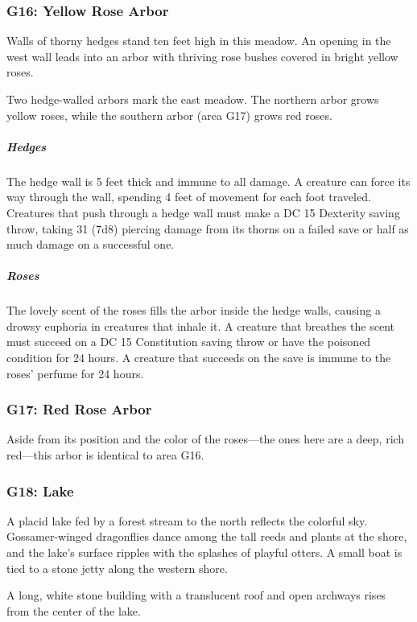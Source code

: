 \documentclass[10pt,a4paper,twoside,bg=print,twocolumn,openany,nodeprecatedcode]{dndbook}
\begin{document}
\subsubsection{G16: Yellow Rose Arbor}
\begin{DndReadAloud}{}
Walls of thorny hedges stand ten feet high in this meadow. An opening in the west wall leads into an arbor with thriving rose bushes covered in bright yellow roses.

\end{DndReadAloud}

Two hedge-walled arbors mark the east meadow. The northern arbor grows yellow roses, while the southern arbor (area G17) grows red roses.

\subparagraph{Hedges}
The hedge wall is 5 feet thick and immune to all damage. A creature can force its way through the wall, spending 4 feet of movement for each foot traveled. Creatures that push through a hedge wall must make a DC 15 Dexterity saving throw, taking 31 (7d8) piercing damage from its thorns on a failed save or half as much damage on a successful one.

\subparagraph{Roses}
The lovely scent of the roses fills the arbor inside the hedge walls, causing a drowsy euphoria in creatures that inhale it. A creature that breathes the scent must succeed on a DC 15 Constitution saving throw or have the poisoned condition for 24 hours. A creature that succeeds on the save is immune to the roses' perfume for 24 hours.

\subsubsection{G17: Red Rose Arbor}
Aside from its position and the color of the roses—the ones here are a deep, rich red—this arbor is identical to area G16.

\subsubsection{G18: Lake}
\begin{DndReadAloud}{}
A placid lake fed by a forest stream to the north reflects the colorful sky. Gossamer-winged dragonflies dance among the tall reeds and plants at the shore, and the lake's surface ripples with the splashes of playful otters. A small boat is tied to a stone jetty along the western shore.

A long, white stone building with a translucent roof and open archways rises from the center of the lake.

\end{DndReadAloud}
\end{document}

